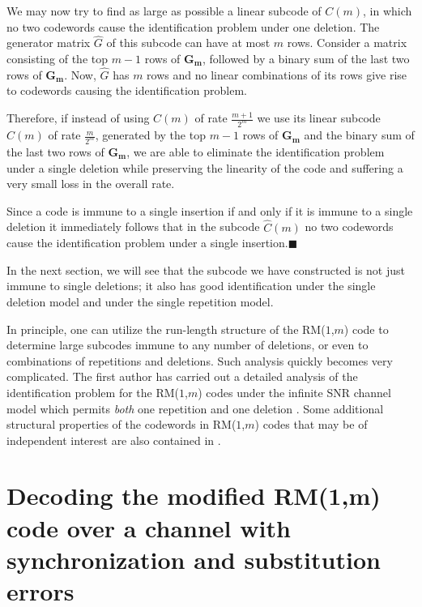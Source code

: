 We may now try to find as large as possible a linear subcode of
$C(m)$, in which no two codewords cause the identification problem
under one deletion. The generator matrix $\hat{G}$ of this subcode
can have at most $m$ rows. Consider a matrix consisting of the top
$m-1$ rows of $\mathbf{G_m}$, followed by a binary sum of the last
two rows of $\mathbf{G_m}$. Now, $\hat{G}$ has $m$ rows and no
linear combinations of its rows give rise to codewords causing the
identification problem.

Therefore, if instead of using $C(m)$ of rate $\frac{m+1}{2^m}$ we
use its linear subcode $\hat{C}(m)$ of rate $\frac{m}{2^m}$,
generated by the top $m-1$ rows of $\mathbf{G_m}$ and the binary sum
of the last two rows of $\mathbf{G_m}$, we are able to eliminate the
identification problem under a single deletion
while preserving the linearity of the code
and suffering a very small loss in the overall rate.

\begin{remark}
Since a code is immune to a single insertion if and only if it is
immune to a single deletion \cite{lev:66} it immediately follows
that in the subcode $\hat{C}(m)$ no two codewords cause the
identification problem under a single
insertion.\hfill$\blacksquare$
\end{remark}
In the next section, we will see that the subcode
we have constructed is not just immune to single
deletions; it also has good identification under
the single deletion model and under the single
repetition model.

In principle, one can utilize the run-length structure of the
RM($1$,$m$) code to determine large subcodes immune to any number
of deletions, or even to combinations of repetitions and
deletions. Such analysis quickly becomes very complicated. The
first author has carried out a detailed analysis of the
identification problem for the RM($1$,$m$) codes under the
infinite SNR channel model which permits {\em both} one repetition
and one deletion \cite{dRMSupTech:06}. %
Some additional structural properties of the codewords in
RM($1$,$m$) codes that may be of independent interest are also
contained in \cite{dRMSupTech:06}.%


\section{Decoding the modified RM(1,m) code over
a channel with synchronization and substitution errors}\label{section5}

